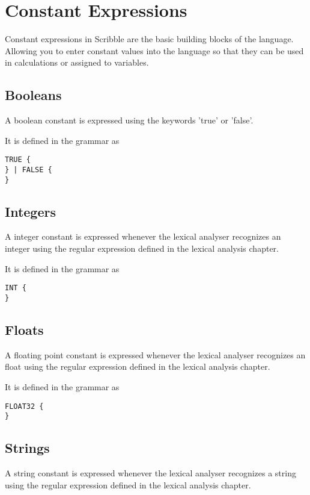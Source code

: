 \documentclass[]{final_report}
\begin{document}
\section{Constant Expressions}

Constant expressions in Scribble are the basic building blocks of the language. Allowing you to enter constant values into the language so that they can be used in calculations or assigned to variables.

\subsection{Booleans}

A boolean constant is expressed using the keywords 'true' or 'false'.

It is defined in the grammar as
\begin{verbatim}
TRUE {
} | FALSE {
}\end{verbatim}

\subsection{Integers}

A integer constant is expressed whenever the lexical analyser recognizes an integer using the regular expression defined in the lexical analysis chapter.

It is defined in the grammar as
\begin{verbatim}
INT {
}
\end{verbatim}

\subsection{Floats}

A floating point constant is expressed whenever the lexical analyser recognizes an float using the regular expression defined in the lexical analysis chapter.

It is defined in the grammar as
\begin{verbatim}
FLOAT32 {
}
\end{verbatim}

\subsection{Strings}

A string constant is expressed whenever the lexical analyser recognizes a string using the regular expression defined in the lexical analysis chapter.
\end{document}
